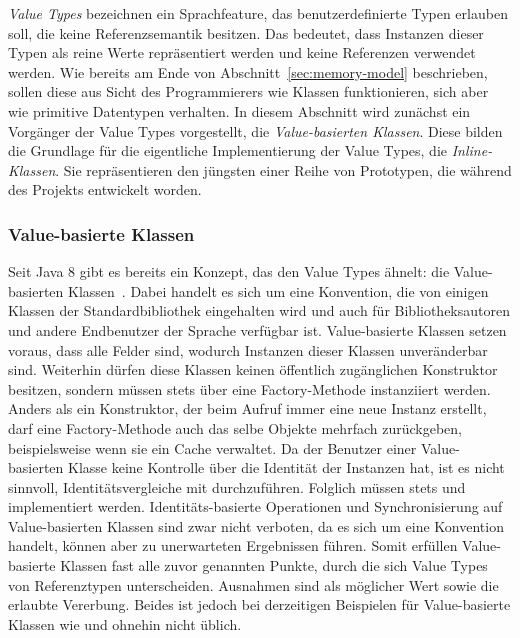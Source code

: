 \emph{Value Types} bezeichnen ein Sprachfeature, das benutzerdefinierte Typen erlauben soll, die keine Referenzsemantik besitzen.
Das bedeutet, dass Instanzen dieser Typen als reine Werte repräsentiert werden und keine Referenzen verwendet werden.
Wie bereits am Ende von Abschnitt~\ref{sec:memory-model} beschrieben, sollen diese aus Sicht des Programmierers wie Klassen funktionieren, sich aber wie primitive Datentypen verhalten.
In diesem Abschnitt wird zunächst ein Vorgänger der Value Types vorgestellt, die \emph{Value-basierten Klassen}.
Diese bilden die Grundlage für die eigentliche Implementierung der Value Types, die \emph{Inline-Klassen}.
Sie repräsentieren den jüngsten einer Reihe von Prototypen, die während des Projekts entwickelt worden.

\subsubsection{Value-basierte Klassen}

Seit Java 8 gibt es bereits ein Konzept, das den Value Types ähnelt: die Value-basierten Klassen~\cite{value-based-classes}.
Dabei handelt es sich um eine Konvention, die von einigen Klassen der Standardbibliothek eingehalten wird und auch für Bibliotheksautoren und andere Endbenutzer der Sprache verfügbar ist.
Value-basierte Klassen setzen voraus, dass alle Felder  sind, wodurch Instanzen dieser Klassen unveränderbar sind.
Weiterhin dürfen diese Klassen keinen öffentlich zugänglichen Konstruktor besitzen, sondern müssen stets über eine Factory-Methode instanziiert werden.
Anders als ein Konstruktor, der beim Aufruf immer eine neue Instanz erstellt, darf eine Factory-Methode auch das selbe Objekte mehrfach zurückgeben, beispielsweise wenn sie ein Cache verwaltet.
Da der Benutzer einer Value-basierten Klasse keine Kontrolle über die Identität der Instanzen hat, ist es nicht sinnvoll, Identitätsvergleiche mit \code{==} durchzuführen.
Folglich müssen stets  und  implementiert werden.
Identitäts-basierte Operationen und Synchronisierung auf Value-basierten Klassen sind zwar nicht verboten, da es sich um eine Konvention handelt, können aber zu unerwarteten Ergebnissen führen.
Somit erfüllen Value-basierte Klassen fast alle zuvor genannten Punkte, durch die sich Value Types von Referenztypen unterscheiden.
Ausnahmen sind  als möglicher Wert sowie die erlaubte Vererbung.
Beides ist jedoch bei derzeitigen Beispielen für Value-basierte Klassen wie  und  ohnehin nicht üblich.

